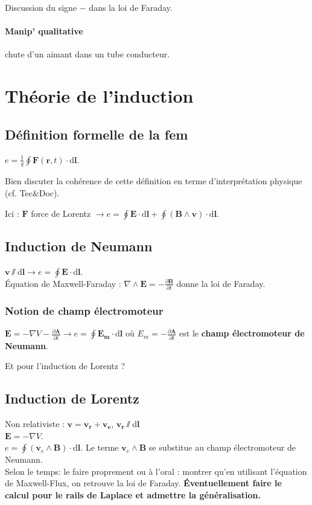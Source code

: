 \documentclass[11pt]{report}
\numberwithin{figure}{section}
\numberwithin{equation}{section}
\numberwithin{table}{section}
\newcommand{\ud}{\mathrm{d}}
\newcommand{\1}{\boldsymbol{1}}
\begin{document}
Discussion du signe $-$ dans la loi de Faraday.

\paragraph*{Manip' qualitative} chute d'un aimant dans un tube conducteur.


\section{Théorie de l'induction}

\subsection{Définition formelle de la fem}

$e = \frac{1}{q} \oint \bm F(\bm r, t) \cdot \ud \bm l$.

Bien discuter la cohérence de cette définition en terme d'interprétation physique (cf. Tec\&Doc).

Ici : $\bm F$ force de Lorentz $\rightarrow e = \oint \bm E \cdot \ud \bm l + \oint (\bm B \land \bm v) \cdot \ud \bm l$.

\subsection{Induction de Neumann}

$\bm v \sslash
 \ud \bm l \rightarrow e = \oint \bm E \cdot \ud \bm l$. \\
 Équation de Maxwell-Faraday : $\nabla \land \bm E = - \frac{\partial \bm B}{\partial t}$ donne la loi de Faraday.

\subsubsection*{Notion de champ électromoteur}

 $\bm E = - \nabla V - \frac{\partial \bm A}{\partial t} \rightarrow e = \oint \bm{E_m} \cdot \ud \bm l $ où $E_m = - \frac{\partial \bm A}{\partial t}$ est le \textbf{champ électromoteur de Neumann}. 
 
 
\textcolor{mycolor5}{Et pour l'induction de Lorentz ?}
 
\subsection{Induction de Lorentz}
 
Non relativiste : $\bm v = \bm{v_r} + \bm{v_e}$, $\bm{v_r} \sslash \ud \bm l$ \\
$\bm E = - \nabla V$. \\
$e = \oint (\bm v_e \land \bm B) \cdot \ud \bm l$. Le terme $\bm v_e \land \bm B$ se substitue au champ électromoteur de Neumann. \\
Selon le temps: le faire proprement ou à l'oral : montrer qu'en utilisant l'équation de Maxwell-Flux, on retrouve la loi de Faraday.
\textbf{Éventuellement faire le calcul pour le rails de Laplace et admettre la généralisation.}
\end{document}
